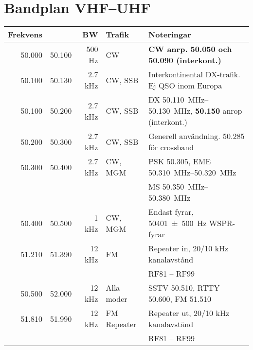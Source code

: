 \section{Bandplan VHF--UHF}

\begin{tabular}{rrrll}
\textbf{Frekvens} &        & \textbf{BW} & \textbf{Trafik}
& \textbf{Noteringar} \\ \hline

50.000 & 50.100 & 500 Hz  & CW          & \textbf{CW anrp. 50.050 och 50.090 (interkont.)}                                    \\ \hline
50.100 & 50.130 & 2.7 kHz & CW, SSB     & Interkontinental DX-trafik. Ej QSO inom Europa                                      \\ \hline
50.100 & 50.200 & 2.7 kHz & CW, SSB      &
DX \SIrange{50,110}{50,130}{\mega\hertz}, \textbf{\num{50,150}} anrop (interkont.)  \\ \hline
50.200 & 50.300 & 2.7 kHz & CW, SSB      & Generell användning. \num{50,285} för crossband                                     \\ \hline
50.300 & 50.400 & 2.7 kHz & CW, MGM     & PSK \num{50,305}, EME \SIrange{50,310}{50,320}{\mega\hertz}                         \\
       &        &         &             & MS \SIrange{50,350}{50,380}{\mega\hertz}                                            \\ \hline
50.400 & 50.500 & 1 kHz   & CW, MGM     & Endast fyrar, \qty{50401(500)}{\hertz} WSPR-fyrar                                        \\ \hline
51.210 & 51.390 & 12 kHz  & FM          & Repeater in, 20/10 kHz kanalavstånd                                                 \\
       &        &         &             & RF81 – RF99                                                                         \\ \hline
50.500 & 52.000 & 12 kHz  & Alla moder  & SSTV \num{50,510}, RTTY \num{50,600}, FM \num{51,510}                               \\ \hline
51.810 & 51.990 & 12 kHz  & FM Repeater & Repeater ut, 20/10 kHz kanalavstånd                                                 \\
       &        &         &             & RF81 – RF99                                                                         \\ \hline
\end{tabular}

